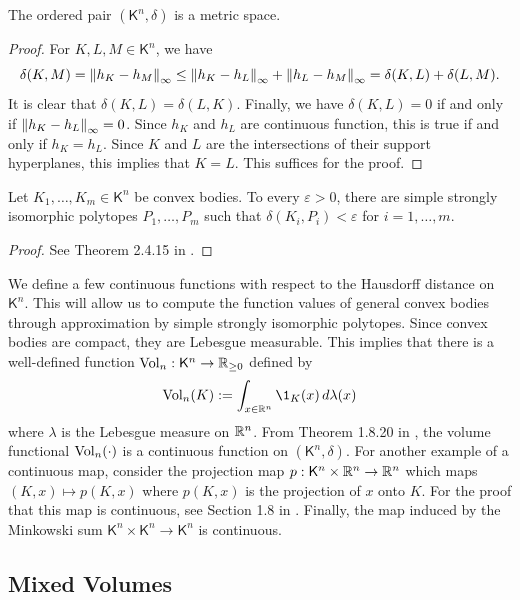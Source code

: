 \documentclass{puthesis-UG}
\begin{document}
\begin{prop} \label{convex-body-is-metric-space}
	The ordered pair $(\mathsf{K}^n, \delta)$ is a metric space. 
\end{prop}

\begin{proof}
	For $K, L, M \in \mathsf{K}^n$, we have 
	\[
		\delta(K, M) = \left\lVert h_K - h_M\right\rVert_\infty \leq \left\lVert h_K - h_L\right\rVert_\infty + \left\lVert h_L - h_M\right\rVert_\infty = \delta(K, L) + \delta(L, M). 
	\]
	It is clear that $\delta (K, L) = \delta (L, K)$. Finally, we have $\delta(K, L) = 0$ if and only if $\left\lVert h_K - h_L\right\rVert_\infty = 0$. Since $h_K$ and $h_L$ are continuous function, this is true if and only if $h_K = h_L$. Since $K$ and $L$ are the intersections of their support hyperplanes, this implies that $K = L$. This suffices for the proof. 
\end{proof}

\begin{thm} \label{approximation-SSI}
	Let $K_1, \ldots, K_m \in \mathsf{K}^n$ be convex bodies. To every $\varepsilon > 0$, there are simple strongly isomorphic polytopes $P_1, \ldots, P_m$ such that $\delta (K_i, P_i) < \varepsilon$ for $i = 1, \ldots, m$.
\end{thm}

\begin{proof}
	See Theorem 2.4.15 in \cite{schneider_2013}. 
\end{proof}

We define a few continuous functions with respect to the Hausdorff distance on $\mathsf{K}^n$. This will allow us to compute the function values of general convex bodies through approximation by simple strongly isomorphic polytopes. Since convex bodies are compact, they are Lebesgue measurable. This implies that there is a well-defined function $\operatorname{Vol}_n : \mathsf{K}^n \to \mathbb{R}_{\geq 0}$ defined by
\[
	\Vol_n (K) := \int_{x \in \RR^n} \1_K(x) \, d \lambda(x)
\]
where $\lambda$ is the Lebesgue measure on $\mathbb{R}^n$. From Theorem 1.8.20 in \cite{schneider_2013}, the volume functional $\operatorname{Vol}_n(\cdot)$ is a continuous function on $(\mathsf{K}^n, \delta)$. For another example of a continuous map, consider the projection map $p : \mathsf{K}^n \times \mathbb{R}^n \to \mathbb{R}^n$ which maps $(K, x) \mapsto p(K, x)$ where $p(K, x)$ is the projection of $x$ onto $K$. For the proof that this map is continuous, see Section 1.8 in \cite{schneider_2013}. Finally, the map induced by the Minkowski sum $\mathsf{K}^n \times \mathsf{K}^n \to \mathsf{K}^n$ is continuous. 


\subsection{Mixed Volumes}
\end{document}
